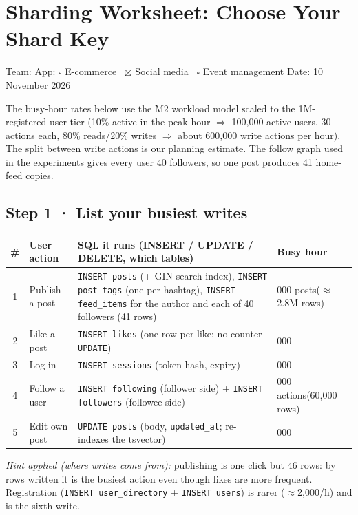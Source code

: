 \section{Sharding Worksheet: Choose Your Shard Key}\label{sec:worksheet}

Team: \teamnames \quad App: $\square$ E-commerce \ $\boxtimes$ Social media \ $\square$ Event management \quad Date: 10 November 2026

The busy-hour rates below use the M2 workload model scaled to the 1M-registered-user tier
(10\% active in the peak hour $\Rightarrow$ 100{,}000 active users, 30 actions each, 80\% reads/20\% writes
$\Rightarrow$ about 600{,}000 write actions per hour). The split between write actions is our planning estimate.
The follow graph used in the experiments gives every user 40 followers, so one post produces
41 home-feed copies.

\subsection*{Step 1 · List your busiest writes}

\begin{center}\small
\begin{tabularx}{\linewidth}{@{}c>{\raggedright}p{2.4cm}>{\raggedright}X>{\raggedleft\arraybackslash}p{2.3cm}@{}}
\toprule
\# & User action & SQL it runs (INSERT / UPDATE / DELETE, which tables) & Busy hour \\
\midrule
1 & Publish a post & \texttt{INSERT posts} (+ GIN search index), \texttt{INSERT post\_tags} (one per hashtag),
\texttt{INSERT feed\_items} for the author and each of 40 followers (41 rows) & 60{,}000 posts\newline ($\approx$2.8M rows) \\
2 & Like a post & \texttt{INSERT likes} (one row per like; no counter \texttt{UPDATE}) & 360{,}000 \\
3 & Log in & \texttt{INSERT sessions} (token hash, expiry) & 100{,}000 \\
4 & Follow a user & \texttt{INSERT following} (follower side) + \texttt{INSERT followers} (followee side) & 30{,}000 actions\newline (60{,}000 rows) \\
5 & Edit own post & \texttt{UPDATE posts} (body, \texttt{updated\_at}; re-indexes the tsvector) & 12{,}000 \\
\bottomrule
\end{tabularx}
\end{center}
\noindent\emph{Hint applied (where writes come from):} publishing is one click but 46 rows:
by rows written it is the busiest action even though likes are more frequent.
Registration (\texttt{INSERT user\_directory} + \texttt{INSERT users}) is rarer ($\approx$2{,}000/h) and is the sixth write.

